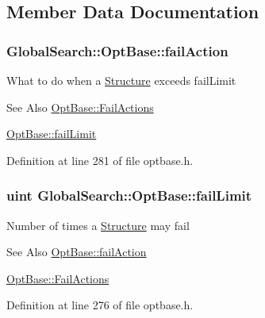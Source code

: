 \subsection{Member Data Documentation}
\hypertarget{classGlobalSearch_1_1OptBase_adda17a1eab956c00c6b14ab3ae451b91}{
\subsubsection[{fail\-Action}]{ Global\-Search\-::\-Opt\-Base\-::fail\-Action}}\label{classGlobalSearch_1_1OptBase_adda17a1eab956c00c6b14ab3ae451b91}
What to do when a \hyperlink{classGlobalSearch_1_1Structure}{Structure} exceeds fail\-Limit \begin{DoxySeeAlso}{See Also}
\hyperlink{classGlobalSearch_1_1OptBase_a970b328cd0a36335c34c6b24c6ac2775}{Opt\-Base\-::\-Fail\-Actions} 

\hyperlink{classGlobalSearch_1_1OptBase_aec8bb712a35c23ab79608a5d70f52b90}{Opt\-Base\-::fail\-Limit} 
\end{DoxySeeAlso}


Definition at line 281 of file optbase.\-h.

\hypertarget{classGlobalSearch_1_1OptBase_aec8bb712a35c23ab79608a5d70f52b90}{
\subsubsection[{fail\-Limit}]{\setlength{\rightskip}{0pt plus 5cm}uint Global\-Search\-::\-Opt\-Base\-::fail\-Limit}}\label{classGlobalSearch_1_1OptBase_aec8bb712a35c23ab79608a5d70f52b90}
Number of times a \hyperlink{classGlobalSearch_1_1Structure}{Structure} may fail \begin{DoxySeeAlso}{See Also}
\hyperlink{classGlobalSearch_1_1OptBase_adda17a1eab956c00c6b14ab3ae451b91}{Opt\-Base\-::fail\-Action} 

\hyperlink{classGlobalSearch_1_1OptBase_a970b328cd0a36335c34c6b24c6ac2775}{Opt\-Base\-::\-Fail\-Actions} 
\end{DoxySeeAlso}


Definition at line 276 of file optbase.\-h.

